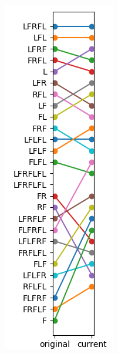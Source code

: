 \documentclass{article}
\begin{document}
\begin{figure}[!htp]
{\begin{subfigure}[b]{0.15\textwidth}
            \includegraphics[width=\textwidth]{path-2}

\end{subfigure}}
\end{figure}
\end{document}
